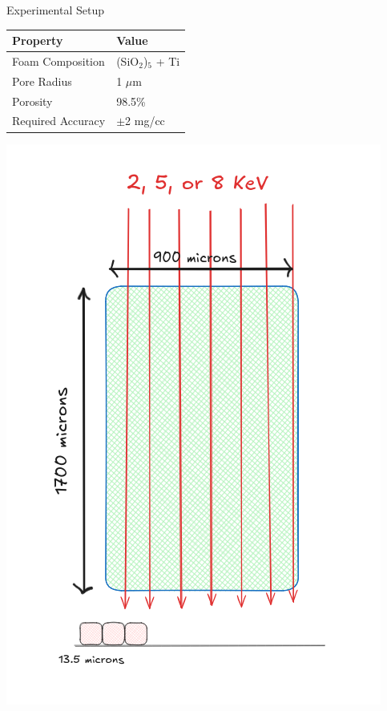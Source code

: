 \documentclass[aspectratio=169,xcolor=dvipsnames]{beamer}
\begin{document}
\begin{frame}{Experimental Setup}
\begin{minipage}{0.32\textwidth}
  \centering
  \small
  \begin{tabular}{ll}
    \toprule
    \textbf{Property} & \textbf{Value} \\
    \midrule
    Foam Composition & (SiO$_2$)$_5$ + Ti \\
    Pore Radius & 1 $\mu$m \\
    Porosity & 98.5\% \\
    Required Accuracy & $\pm$2 mg/cc \\
    \bottomrule
  \end{tabular}
\end{minipage}
\hfill
\begin{minipage}{0.32\textwidth}
  \centering
  \includegraphics[width=\textwidth]{foamimagingparameters.png}
\end{minipage}
\end{frame}
\end{document}
